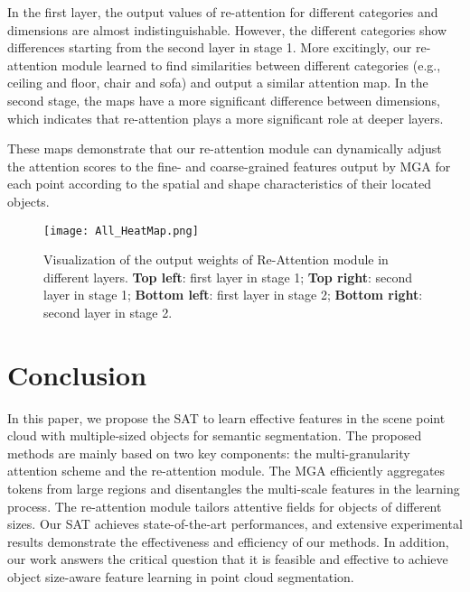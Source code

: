\documentclass[10pt,twocolumn,letterpaper]{article}
\begin{document}
In the first layer, the output values of re-attention for different categories and dimensions are almost indistinguishable. However, the different categories show differences starting from the second layer in stage 1. More excitingly, our re-attention module learned to find similarities between different categories (e.g., ceiling and floor, chair and sofa) and output a similar attention map. In the second stage, the maps have a more significant difference between dimensions, which indicates that re-attention plays a more significant role at deeper layers.

These maps demonstrate that our re-attention module can dynamically adjust the attention scores to the fine- and coarse-grained features output by MGA for each point according to the spatial and shape characteristics of their located objects.


\begin{figure}
\centering
\texttt{[image: All\_HeatMap.png]}
\caption{Visualization of the output weights of Re-Attention module in different layers. \textbf{Top left}: first layer in stage 1; \textbf{Top right}: second layer in stage 1; \textbf{Bottom left}: first layer in stage 2; \textbf{Bottom right}: second layer in stage 2.}
\label{fig_heatmap}
\end{figure}








\section{Conclusion}

In this paper, we propose the SAT to learn effective features in the scene point cloud with multiple-sized objects for semantic segmentation. The proposed methods are mainly based on two key components: the multi-granularity attention scheme and the re-attention module. The MGA efficiently aggregates tokens from large regions and disentangles the multi-scale features in the learning process. The re-attention module tailors attentive fields for objects of different sizes. Our SAT achieves state-of-the-art performances, and extensive experimental results demonstrate the effectiveness and efficiency of our methods. In addition, our work answers the critical question that it is feasible and effective to achieve object size-aware feature learning in point cloud segmentation. 





\clearpage

{\small


}
\end{document}
